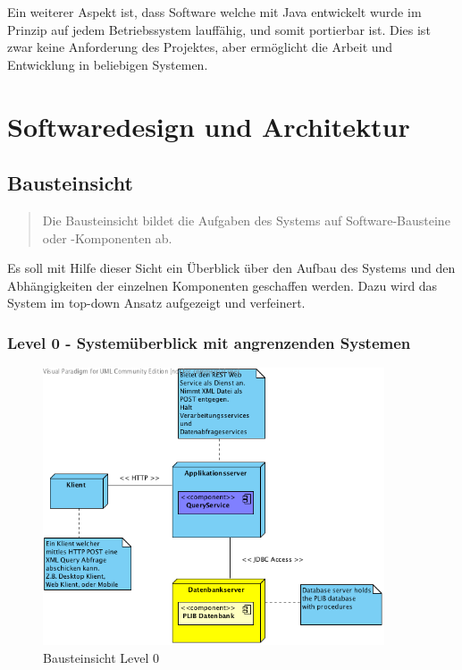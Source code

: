 Ein weiterer Aspekt ist, dass Software welche mit Java entwickelt wurde im Prinzip auf jedem Betriebssystem lauffähig, und somit portierbar ist. Dies ist zwar keine Anforderung des Projektes, aber ermöglicht die Arbeit und Entwicklung in beliebigen Systemen. 

\section{Softwaredesign und Architektur}

\subsection{Bausteinsicht}
\begin{quotation}
Die Bausteinsicht bildet die Aufgaben des Systems auf Software-Bausteine oder -Komponenten ab.
 \citep[S. 98ff][]{starke}	
\end{quotation}

Es soll mit Hilfe dieser Sicht ein Überblick über den Aufbau des Systems und den Abhängigkeiten der einzelnen Komponenten geschaffen werden. Dazu wird das System im top-down Ansatz aufgezeigt und verfeinert. 

\subsubsection{Level 0 - Systemüberblick mit angrenzenden Systemen} 

\begin{figure}[htbp]
	\centering
		\includegraphics[width=0.9\textwidth]{images/bausteinsicht_plib_level0.png}
	\caption{Bausteinsicht Level 0}
	\label{fig:bausteinsicht_level0}
\end{figure}

